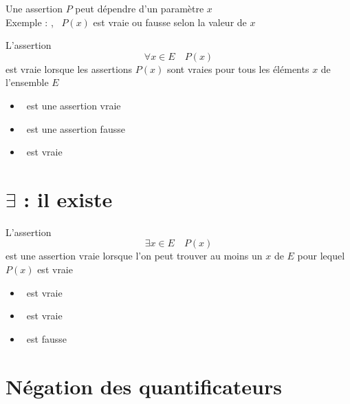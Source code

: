 \begin{frame}
Une assertion $P$ peut dépendre d'un paramètre $x$\\[0.5em]

Exemple : , \  
$P(x)$ est vraie ou fausse selon la valeur de $x$

\pause
\bigskip

L'assertion $$\forall x \in E \quad P(x)$$
est vraie lorsque les assertions $P(x)$ sont vraies pour tous les éléments $x$
de l'ensemble $E$

\pause
\bigskip

\begin{itemize}
  \item \assertion{$\forall x \in [1,+\infty[ \quad (x^2\ge 1)$} \  est une assertion vraie
\pause

  \item {} \  est une assertion fausse
\pause

  \item {} \ est vraie
\end{itemize} 

\end{frame}



\section{$\exists$ : \og il existe\fg}

\begin{frame}
L'assertion 
$$\exists x \in E \quad P(x)$$
est une assertion vraie lorsque l'on peut trouver au moins un $x$ de $E$ pour lequel $P(x)$ est vraie

\pause
\bigskip

\begin{itemize}
  \item {} \  est vraie
  \item \assertion{$\exists n \in \Nn \quad n^2-n > n$} \  est vraie
  \item \assertion{$\exists x \in \Rr \quad (x^2=-1)$} \ est fausse
\end{itemize} 


\end{frame}


\section{Négation des quantificateurs}

